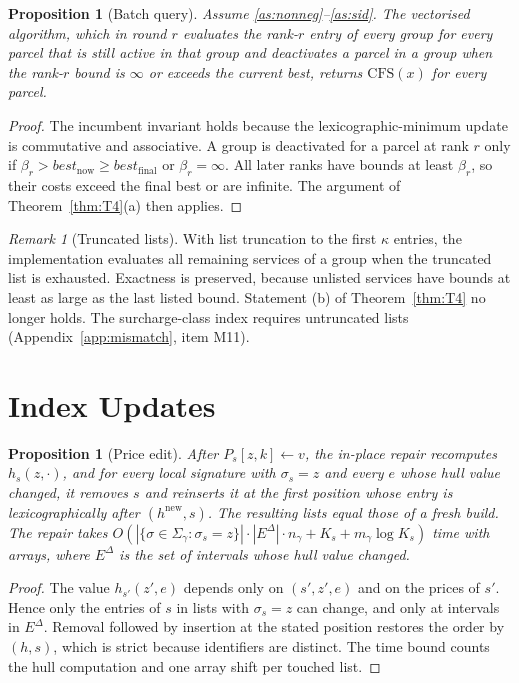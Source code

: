\documentclass[11pt]{article}
\newtheorem{proposition}[theorem]{Proposition}
\theoremstyle{definition}
\theoremstyle{remark}
\newtheorem{remark}[theorem]{Remark}
\newcommand{\cfs}{\mathrm{CFS}}
\begin{document}
\begin{proposition}[Batch query]\label{prop:batch}
Assume \ref{as:nonneg}--\ref{as:sid}. The vectorised algorithm, which in round $r$ evaluates
the rank-$r$ entry of every group for every parcel that is still active in that group and
deactivates a parcel in a group when the rank-$r$ bound is $\infty$ or exceeds the current
best, returns $\cfs(x)$ for every parcel.
\end{proposition}
\begin{proof}
The incumbent invariant holds because the lexicographic-minimum update is commutative
and associative. A group is deactivated for a parcel at rank $r$ only if
$\beta_r>\mathit{best}_{\mathrm{now}}\ge\mathit{best}_{\mathrm{final}}$ or $\beta_r=\infty$. All
later ranks have bounds at least $\beta_r$, so their costs exceed the final best or are
infinite. The argument of Theorem~\ref{thm:T4}(a) then applies.
\end{proof}

\begin{remark}[Truncated lists]
With list truncation to the first $\kappa$ entries, the implementation evaluates all
remaining services of a group when the truncated list is exhausted. Exactness is
preserved, because unlisted services have bounds at least as large as the last listed
bound. Statement (b) of Theorem~\ref{thm:T4} no longer holds. The surcharge-class index
requires untruncated lists (Appendix~\ref{app:mismatch}, item M11).
\end{remark}

\section{Index Updates}\label{sec:updates}

\begin{proposition}[Price edit]\label{prop:priceedit}
After $P_s[z,k]\leftarrow v$, the in-place repair recomputes $h_s(z,\cdot)$, and for every
local signature with $\sigma_s=z$ and every $e$ whose hull value changed, it removes $s$ and
reinserts it at the first position whose entry is lexicographically after
$(h^{\mathrm{new}},s)$. The resulting lists equal those of a fresh build. The repair takes
$O(|\{\sigma\in\Sigma_\gamma:\sigma_s=z\}|\cdot|E^\Delta|\cdot n_\gamma+K_s+m_\gamma\log K_s)$ time
with arrays, where $E^\Delta$ is the set of intervals whose hull value changed.
\end{proposition}
\begin{proof}
The value $h_{s'}(z',e)$ depends only on $(s',z',e)$ and on the prices of $s'$. Hence only
the entries of $s$ in lists with $\sigma_s=z$ can change, and only at intervals in
$E^\Delta$. Removal followed by insertion at the stated position restores the order by
$(h,s)$, which is strict because identifiers are distinct. The time bound counts the
hull computation and one array shift per touched list.
\end{proof}
\end{document}
